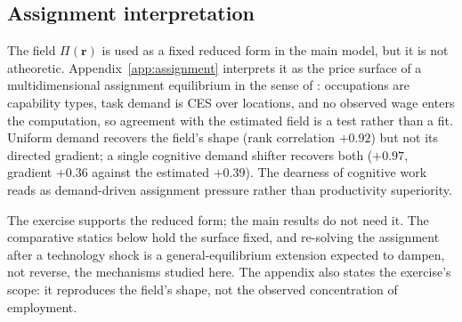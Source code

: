 

\subsection{Assignment interpretation}
\label{sec:assignment-interpretation}

The field $\Pi(\mathbf{r})$ is used as a fixed reduced form in the main
model, but it is not atheoretic. Appendix~\ref{app:assignment}
interprets it as the price surface of a multidimensional assignment
equilibrium in the sense of \textcite{lindenlaub2017}: occupations are
capability types, task demand is CES over locations, and no observed
wage enters the computation, so agreement with the estimated field is a
test rather than a fit. Uniform demand recovers the field's shape (rank
correlation $+0.92$) but not its directed gradient; a single cognitive
demand shifter recovers both ($+0.97$, gradient $+0.36$ against the
estimated $+0.39$). The dearness of cognitive work reads as
demand-driven assignment pressure rather than productivity superiority.

The exercise supports the reduced form; the main results do not need
it. The comparative statics below hold the surface fixed, and
re-solving the assignment after a technology shock is a
general-equilibrium extension expected to dampen, not reverse, the
mechanisms studied here. The appendix also states the exercise's scope:
it reproduces the field's shape, not the observed concentration of
employment.





